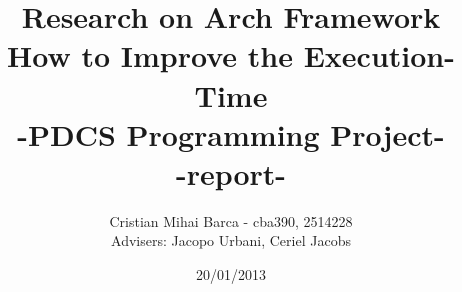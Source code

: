\begin{titlepage}
\title{Research on Arch Framework \\ How to Improve the Execution-Time \\ -PDCS Programming Project-  \\ -report-}
\author{Cristian Mihai Barca - cba390, 2514228 \\ Advisers: Jacopo Urbani, Ceriel Jacobs}
\date{20/01/2013}
\maketitle
\end{titlepage}
